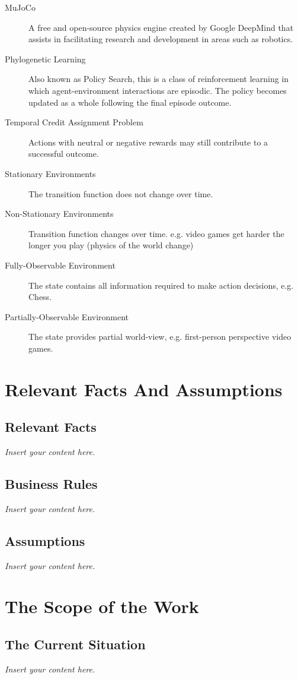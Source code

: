 \documentclass[12pt]{article}
\newcommand{\lips}{\textit{Insert your content here.}}
\begin{document}
\begin{description}
  \item [MuJoCo]\label{def:mujoco} A free and open-source physics engine created by Google DeepMind that assists in facilitating research and development in areas such as robotics.
  \item [Phylogenetic Learning]\label{def:phylogenetic_learning} Also known as Policy Search, this is a class of reinforcement learning in which agent-environment interactions are episodic. The policy becomes updated as a whole following the final episode outcome.
  \item [Temporal Credit Assignment Problem]\label{def:temporal_credit} Actions with neutral or negative rewards may still contribute to a successful outcome.
  \item [Stationary Environments]\label{def:stationary_env} The transition function does not change over time.
  \item [Non-Stationary Environments]\label{def:nonstationary_env} Transition function changes over time. e.g. video games get harder the longer you play (physics of the world change)
  \item [Fully-Observable Environment]\label{fully_obs_env} The state contains all information required to make action decisions, e.g. Chess.
  \item [Partially-Observable Environment]\label{partial_obs_env} The state provides partial world-view, e.g. first-person perspective video games.
\end{description}

\section{Relevant Facts And Assumptions}
\subsection{Relevant Facts}
\lips
\subsection{Business Rules}
\lips
\subsection{Assumptions}
\lips

\section{The Scope of the Work}
\subsection{The Current Situation}
\lips
\end{document}
